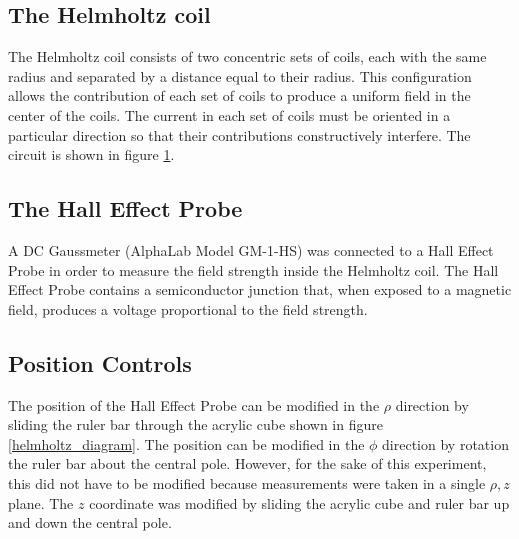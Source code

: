 \documentclass[a4paper]{article}
\begin{document}
\subsection{The Helmholtz coil}


\qq The Helmholtz coil consists of two concentric sets of coils, each with the same
radius and separated by a distance equal to their radius. This configuration
allows the contribution of each set of coils to produce a uniform field in the
center of the coils. The current in each set of coils must be oriented in a
particular direction so that their contributions constructively interfere. The
circuit is shown in figure \ref{helmholtz_circuit}.

\begin{figure}[h]
\centering


\label{helmholtz_circuit}
\end{figure}

\subsection{The Hall Effect Probe}


\qq A DC Gaussmeter (AlphaLab Model GM-1-HS) was connected to a Hall Effect Probe in
order to measure the field strength inside the Helmholtz coil. The Hall Effect
Probe contains a semiconductor junction that, when exposed to a magnetic field,
produces a voltage proportional to the field strength.


\subsection{Position Controls}


\qq The position of the Hall Effect Probe can be modified in the $\rho$ direction by
sliding the ruler bar through the acrylic cube shown in figure
\ref{helmholtz_diagram}. The position can be modified in the $\phi$ direction by
rotation the ruler bar about the central pole. However, for the sake of this
experiment, this did not have to be modified because measurements were taken in
a single $\rho , z$ plane. The $z$ coordinate was modified by sliding the
acrylic cube and ruler bar up and down the central pole.
\end{document}
